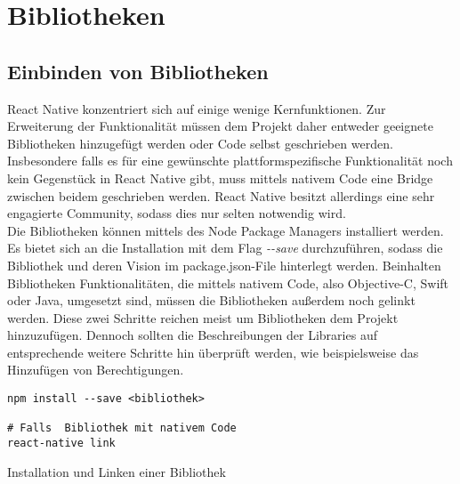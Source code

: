 \section{Bibliotheken}

\subsection{Einbinden von Bibliotheken}
React Native konzentriert sich auf einige wenige Kernfunktionen. Zur Erweiterung der Funktionalität müssen dem Projekt daher entweder geeignete Bibliotheken hinzugefügt werden oder Code selbst geschrieben werden. Insbesondere falls es für eine gewünschte plattformspezifische Funktionalität noch kein Gegenstück in React Native gibt, muss mittels nativem Code eine Bridge zwischen beidem geschrieben werden. React Native besitzt allerdings eine sehr engagierte Community, sodass dies nur selten notwendig wird.\\
Die Bibliotheken können mittels des Node Package Managers installiert werden. Es bietet sich an die Installation mit dem Flag \textit{-{}-save} durchzuführen, sodass die Bibliothek und deren Vision im package.json-File hinterlegt werden. Beinhalten Bibliotheken Funktionalitäten, die mittels nativem Code, also Objective-C, Swift oder Java, umgesetzt sind, müssen die Bibliotheken außerdem noch gelinkt werden. Diese zwei Schritte reichen meist um Bibliotheken dem Projekt hinzuzufügen. Dennoch sollten die Beschreibungen der Libraries auf entsprechende weitere Schritte hin überprüft werden, wie beispielsweise das Hinzufügen von Berechtigungen. 

\begin{listing}[H]
    \begin{verbatim}
npm install --save <bibliothek>

# Falls  Bibliothek mit nativem Code
react-native link
    \end{verbatim}
    \caption{Installation und Linken einer Bibliothek}
    \label{lst:lib_install}
\end{listing}


